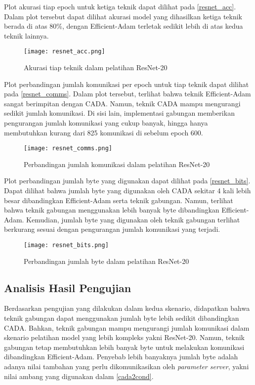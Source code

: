 Plot akurasi tiap epoch untuk ketiga teknik dapat dilihat pada \autoref{resnet_acc}. Dalam plot tersebut dapat dilihat akurasi model yang dihasilkan ketiga teknik berada di atas 80\%, dengan Efficient-Adam terletak sedikit lebih di atas kedua teknik lainnya.

\begin{figure}[H]
  \centering
  \texttt{[image: resnet\_acc.png]}
  \caption{Akurasi tiap teknik dalam pelatihan ResNet-20}\label{resnet_acc}
\end{figure}

Plot perbandingan jumlah komunikasi per epoch untuk tiap teknik dapat dilihat pada \autoref{resnet_comms}. Dalam plot tersebut, terlihat bahwa teknik Efficient-Adam sangat berimpitan dengan CADA. Namun, teknik CADA mampu mengurangi sedikit jumlah komunikasi. Di sisi lain, implementasi gabungan memberikan pengurangan jumlah komunikasi yang cukup banyak, hingga hanya membutuhkan kurang dari 825 komunikasi di sebelum epoch 600.

\begin{figure}[H]
  \centering
  \texttt{[image: resnet\_comms.png]}
  \caption{Perbandingan jumlah komunikasi dalam pelatihan ResNet-20}\label{resnet_comms}
\end{figure}

Plot perbandingan jumlah byte yang digunakan dapat dilihat pada \autoref{resnet_bits}. Dapat dilihat bahwa jumlah byte yang digunakan oleh CADA sekitar 4 kali lebih besar dibandingkan Efficient-Adam serta teknik gabungan. Namun, terlihat bahwa teknik gabungan menggunakan lebih banyak byte dibandingkan Efficient-Adam. Kemudian, jumlah byte yang digunakan oleh teknik gabungan terlihat berkurang sesuai dengan pengurangan jumlah komunikasi yang terjadi.

\begin{figure}[H]
  \centering
  \texttt{[image: resnet\_bits.png]}
  \caption{Perbandingan jumlah byte dalam pelatihan ResNet-20}\label{resnet_bits}
\end{figure}


\subsection{Analisis Hasil Pengujian}

Berdasarkan pengujian yang dilakukan dalam kedua skenario, didapatkan bahwa teknik gabungan dapat menggunakan jumlah byte lebih sedikit dibandingkan CADA. Bahkan, teknik gabungan mampu mengurangi jumlah komunikasi dalam skenario pelatihan model yang lebih kompleks yakni ResNet-20. Namun, teknik gabungan tetap membutuhkan lebih banyak byte untuk melakukan komunikasi dibandingkan Efficient-Adam. Penyebab lebih banyaknya jumlah byte adalah adanya nilai tambahan yang perlu dikomunikasikan oleh \emph{parameter server}, yakni nilai ambang yang digunakan dalam \autoref{cada2cond}.

